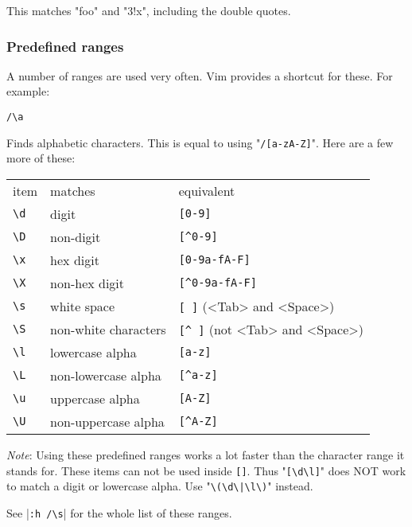 This matches "foo" and "3!x", including the double quotes.
\subsubsection{Predefined ranges}
A number of ranges are used very often.
Vim provides a shortcut for these.
For example:

\begin{Verbatim}[samepage=true]
 /\a
\end{Verbatim}

Finds alphabetic characters.
This is equal to using "\texttt{/[a-zA-Z]}".
Here are a few more of these:

\begin{center} \begin{tabular}{l l l}
				item & matches & equivalent \\
				\texttt{\textbackslash{}d} & digit & \texttt{[0-9]}\\
				\texttt{\textbackslash{}D} & non-digit & \texttt{[\^{}0-9]}\\
				\texttt{\textbackslash{}x} & hex digit & \texttt{[0-9a-fA-F]}\\
				\texttt{\textbackslash{}X} & non-hex digit & \texttt{[\^{}0-9a-fA-F]}\\
				\texttt{\textbackslash{}s} & white space & \texttt{[   ]} (<Tab> and <Space>)\\
				\texttt{\textbackslash{}S} & non-white characters & \texttt{[\^{}  ]} (not <Tab> and <Space>)\\
				\texttt{\textbackslash{}l} & lowercase alpha & \texttt{[a-z]}\\
				\texttt{\textbackslash{}L} & non-lowercase alpha & \texttt{[\^{}a-z]}\\
				\texttt{\textbackslash{}u} & uppercase alpha & \texttt{[A-Z]}\\
				\texttt{\textbackslash{}U} & non-uppercase alpha & \texttt{[\^{}A-Z]}\\
\end{tabular} \end{center}

\emph{Note}:
Using these predefined ranges works a lot faster than the character range it stands for.
These items can not be used inside \texttt{[]}.
Thus "\texttt{[\textbackslash{}d\textbackslash{}l]}" does NOT work to match a digit or lowercase alpha.
Use "\texttt{\textbackslash{}(\textbackslash{}d\textbackslash{}|\textbackslash{}l\textbackslash{})}" instead.

See |\texttt{:h /\textbackslash{}s}| for the whole list of these ranges.
